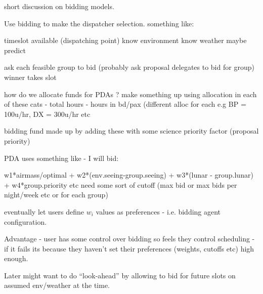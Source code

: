 short discussion on bidding models.

Use bidding to make the dispatcher selection. something like:

timeslot available (dispatching point)
 know environment
 know weather
 maybe predict

ask each feasible group to bid (probably ask proposal delegates to bid for group)
winner takes slot

how do we allocate funds for PDAs ?
 make something up using allocation in each of these cats
 - total hours
 - hours in bd/pax (different alloc for each e.g BP = 100u/hr, DX = 300u/hr etc

bidding fund made up by adding these with some science priority factor (proposal priority)

PDA uses something like - I will bid:

w1*airmass/optimal + w2*(env.seeing-group.seeing) + w3*(lunar - group.lunar) + w4*group.priority etc
need some sort of cutoff (max bid or max bids per night/week etc or for each group)

eventually let users define $w_i$ values as preferences - i.e. bidding agent configuration.

Advantage - user has some control over bidding so feels they control scheduling - if it fails its because 
they haven't set their preferences (weights, cutoffs etc) high enough.

Later might want to do ``look-ahead'' by allowing to bid for future slots on assumed env/weather at the time.
